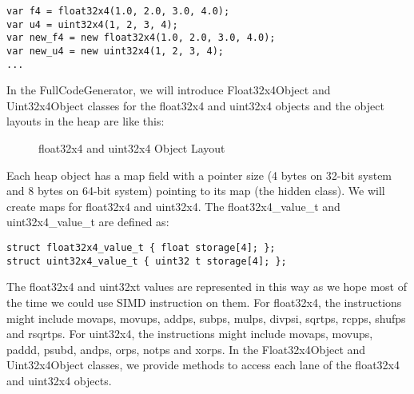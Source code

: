 \documentclass[12pt]{article} %
\begin{document}
\begin{lstlisting}
var f4 = float32x4(1.0, 2.0, 3.0, 4.0);
var u4 = uint32x4(1, 2, 3, 4);
var new_f4 = new float32x4(1.0, 2.0, 3.0, 4.0);
var new_u4 = new uint32x4(1, 2, 3, 4);
...
\end{lstlisting}

In the FullCodeGenerator, we will introduce Float32x4Object and Uint32x4Object
classes for the float32x4 and uint32x4 objects and the object layouts in the
heap are like this:

\mbox{}

\begin{figure}[h!]
\centering
{}
\caption{float32x4 and uint32x4 Object Layout}
\label{fig:layout2}
\end{figure}

\mbox{}

Each heap object has a map field with a pointer size (4 bytes on 32-bit system and 8 bytes on 64-bit system) pointing to its map (the hidden class). We will create maps for float32x4 and uint32x4. The float32x4\_value\_t and uint32x4\_value\_t are defined as:

\begin{lstlisting}
struct float32x4_value_t { float storage[4]; };
struct uint32x4_value_t { uint32 t storage[4]; };
\end{lstlisting}

The float32x4 and uint32xt values are represented in this way as we hope most
of the time we could use SIMD instruction on them. For float32x4, the
instructions might include movaps, movups, addps, subps, mulps, divpsi, sqrtps,
rcpps, shufps and rsqrtps. For uint32x4, the instructions might include movaps,
movups, paddd, psubd, andps, orps, notps and xorps. In the Float32x4Object and
Uint32x4Object classes, we provide methods to access each lane of the float32x4
and uint32x4 objects.
\end{document}
